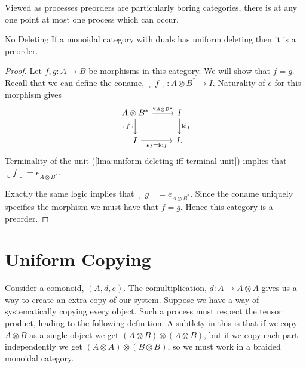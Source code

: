 \documentclass[fleqn]{NotesClass}
\DeclareMathOperator{\id}{id}
\newcommand{\coname}[1]{\llcorner #1 \lrcorner}
\begin{document}
    Viewed as processes preorders are particularly boring categories, there is at any one point at most one process which can occur.
    
    \begin{thm}{No Deleting}{}
        If a monoidal category with duals has uniform deleting then it is a preorder.
        
        \begin{proof}
            Let \(f, g \colon A \to B\) be morphisms in this category.
            We will show that \(f = g\).
            Recall that we can define the coname, \(\coname{f} \colon A \otimes B^* \to I\).
            Naturality of \(e\) for this morphism gives
            \begin{equation}
                \begin{tikzcd}
                    A \otimes B^* \arrow[r, "e_{A\otimes B^*}"] \arrow[d, "\coname{f}"'] & I \arrow[d, "\id_I"]\\
                    I \arrow[r, "e_I = \id_I"'] & I.
                \end{tikzcd}
            \end{equation}
            Terminality of the unit (\cref{lma:uniform deleting iff terminal unit}) implies that \(\coname{f} = e_{A\otimes B^*}\).
            
            Exactly the same logic implies that \(\coname{g} = e_{A \otimes B^*}\).
            Since the coname uniquely specifies the morphism we must have that \(f = g\).
            Hence this category is a preorder.
        \end{proof}
    \end{thm}
    
    \section{Uniform Copying}
    Consider a comonoid, \((A, d, e)\).
    The comultiplication, \(d \colon A \to A \otimes A\) gives us a way to create an extra copy of our system.
    Suppose we have a way of systematically copying every object.
    Such a process must respect the tensor product, leading to the following definition.
    A subtlety in this is that if we copy \(A \otimes B\) as a single object we get \((A \otimes B) \otimes (A \otimes B)\), but if we copy each part independently we get \((A \otimes A) \otimes (B \otimes B)\), so we must work in a braided monoidal category.
    
\end{document}
